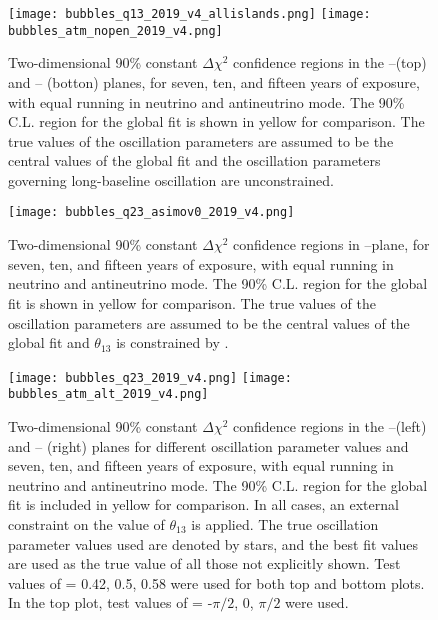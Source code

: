 \begin{figure}[htbp]
  \centering
  \texttt{[image: bubbles\_q13\_2019\_v4\_allislands.png]}
  \texttt{[image: bubbles\_atm\_nopen\_2019\_v4.png]}
  \caption[Two-dimensional 90\% constant $\Delta\chi^{2}$ confidence region in the --\deltacp and -- planes]{Two-dimensional 90\% constant $\Delta\chi^{2}$ confidence regions in the --\deltacp (top) and -- (botton) planes, for seven, ten, and fifteen years of exposure, with equal running in neutrino and antineutrino mode. The 90\% C.L. region for the  global fit is shown in yellow for comparison. The true values of the oscillation parameters are assumed to be the central values of the  global fit and the oscillation parameters governing long-baseline oscillation are unconstrained.}
    \label{fig:res_nopen_asimov0}
\end{figure}
\begin{figure}[htbp]
    \centering
    \texttt{[image: bubbles\_q23\_asimov0\_2019\_v4.png]}
    \caption[Two-dimensional 90\% constant $\Delta\chi^{2}$ confidence regions in the --\deltacp plane]{Two-dimensional 90\% constant $\Delta\chi^{2}$ confidence regions in --\deltacp plane, for seven, ten, and fifteen years of exposure, with equal running in neutrino and antineutrino mode. The 90\% C.L. region for the  global fit is shown in yellow for comparison. The true values of the oscillation parameters are assumed to be the central values of the  global fit and $\theta_{13}$ is constrained by .}
    \label{fig:res_th23vdcp}
\end{figure}
\begin{figure*}[htbp]
    \centering
    \texttt{[image: bubbles\_q23\_2019\_v4.png]}
    \texttt{[image: bubbles\_atm\_alt\_2019\_v4.png]}
    \caption[Two-dimensional 90\% constant $\Delta\chi^{2}$ confidence regions in the --\deltacp and -- planes for different oscillation parameter values]{Two-dimensional 90\% constant $\Delta\chi^{2}$ confidence regions in the --\deltacp (left) and -- (right) planes for different oscillation parameter values and seven, ten, and fifteen years of exposure, with equal running in neutrino and antineutrino mode. The 90\% C.L. region for the  global fit is included in yellow for comparison. In all cases, an external constraint on the value of $\theta_{13}$ is applied. The true oscillation parameter values used are denoted by stars, and the  best fit values are used as the true value of all those not explicitly shown. Test values of  = 0.42, 0.5, 0.58 were used for both top and bottom plots. In the top plot, test values of \deltacp = -$\pi/2$, 0, $\pi/2$ were used.}
    \label{fig:res_pen_various}
\end{figure*}

